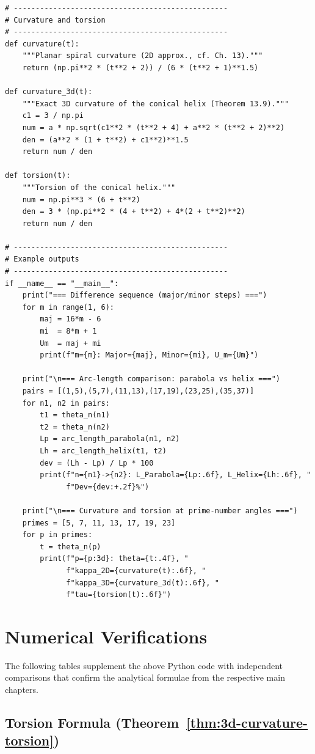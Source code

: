 \begin{verbatim}
# -------------------------------------------------
# Curvature and torsion
# -------------------------------------------------
def curvature(t):
    """Planar spiral curvature (2D approx., cf. Ch. 13)."""
    return (np.pi**2 * (t**2 + 2)) / (6 * (t**2 + 1)**1.5)

def curvature_3d(t):
    """Exact 3D curvature of the conical helix (Theorem 13.9)."""
    c1 = 3 / np.pi
    num = a * np.sqrt(c1**2 * (t**2 + 4) + a**2 * (t**2 + 2)**2)
    den = (a**2 * (1 + t**2) + c1**2)**1.5
    return num / den

def torsion(t):
    """Torsion of the conical helix."""
    num = np.pi**3 * (6 + t**2)
    den = 3 * (np.pi**2 * (4 + t**2) + 4*(2 + t**2)**2)
    return num / den

# -------------------------------------------------
# Example outputs
# -------------------------------------------------
if __name__ == "__main__":
    print("=== Difference sequence (major/minor steps) ===")
    for m in range(1, 6):
        maj = 16*m - 6
        mi  = 8*m + 1
        Um  = maj + mi
        print(f"m={m}: Major={maj}, Minor={mi}, U_m={Um}")

    print("\n=== Arc-length comparison: parabola vs helix ===")
    pairs = [(1,5),(5,7),(11,13),(17,19),(23,25),(35,37)]
    for n1, n2 in pairs:
        t1 = theta_n(n1)
        t2 = theta_n(n2)
        Lp = arc_length_parabola(n1, n2)
        Lh = arc_length_helix(t1, t2)
        dev = (Lh - Lp) / Lp * 100
        print(f"n={n1}->{n2}: L_Parabola={Lp:.6f}, L_Helix={Lh:.6f}, "
              f"Dev={dev:+.2f}%")

    print("\n=== Curvature and torsion at prime-number angles ===")
    primes = [5, 7, 11, 13, 17, 19, 23]
    for p in primes:
        t = theta_n(p)
        print(f"p={p:3d}: theta={t:.4f}, "
              f"kappa_2D={curvature(t):.6f}, "
              f"kappa_3D={curvature_3d(t):.6f}, "
              f"tau={torsion(t):.6f}")
\end{verbatim}

\section{Numerical Verifications}

The following tables supplement the above Python code with independent
comparisons that confirm the analytical formulae from the respective
main chapters.

\subsection{Torsion Formula (Theorem~\ref{thm:3d-curvature-torsion})} 

